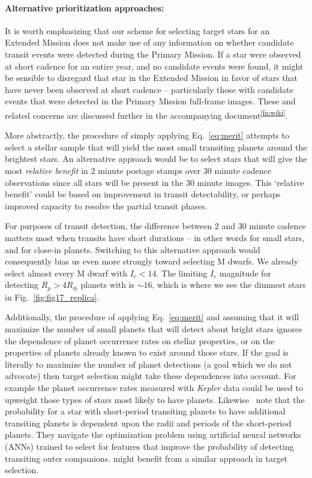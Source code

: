\paragraph{Alternative prioritization approaches:}

It is worth emphasizing that our scheme for selecting target stars for
an Extended Mission does not make use of any information on whether
candidate transit events were detected during the Primary Mission.  If
a star were observed at short cadence for an entire year, and no
candidate events were found, it might be sensible to disregard that
star in the Extended Mission in favor of stars that have never been
observed at short cadence -- particularly those with candidate events
that were detected in the Primary Mission full-frame images.  These
and related concerns are discussed further in the accompanying
document\textsuperscript{\ref{fn:wiki}}.

More abstractly, the procedure of simply applying Eq.~\ref{eq:merit}
attempts to select a stellar sample that will yield the most small
transiting planets around the brightest stars.  An alternative
approach would be to select stars that will give the most 
\textit{relative benefit} in 2 minute postage stamps over 30 
minute cadence observations since all stars will be present in the
30 minute images.  This `relative benefit' could be based on
improvement in transit detectability, or perhaps improved 
capacity to resolve the partial transit phases.

For purposes of transit detection, the difference between 2 and 30
minute cadence matters most when transits have short durations -- in
other words for small stars, and for close-in planets.  Switching to
this alternative approach would consequently bias us even more
strongly toward selecting M dwarfs.  We already select almost every M
dwarf with $I_c < 14$.  The limiting $I_c$ magnitude for detecting
$R_p > 4R_\oplus$ planets with \tess is $\sim\!16$, which is where we
see the dimmest stars in Fig.~\ref{fig:fig17_replica}.

Additionally, the procedure of applying Eq.~\ref{eq:merit} and
assuming that it will maximize the number of small planets that \tess
will detect about bright stars ignores the dependence of
planet occurrence rates on stellar properties, or on the properties of
 planets already known to exist around those stars. If the goal is literally to maximize the number of planet
detections (a goal which we do not advocate) then \tesss target selection might take these dependences into
account. For example the planet occurrence rates measured with {\it Kepler} data could be used
to upweight those types of stars most likely to have planets.
Likewise~\protect\citet{kipping_transit_2016} note that the
probability for a star with short-period transiting planets to have additional transiting
planets is dependent upon the radii and periods of the
short-period planets.  They navigate the optimization problem using artificial neural
networks (ANNs) trained to select for features that improve the
probability of detecting transiting outer companions.  \tess might
benefit from a similar approach in target selection.

